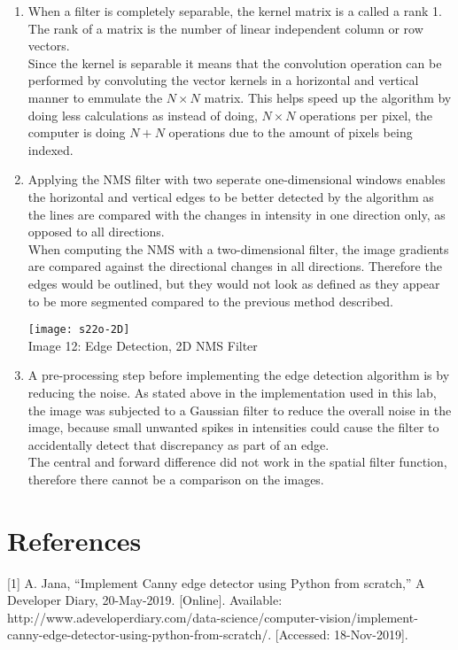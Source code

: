\documentclass{article}
\begin{document}
	\begin{enumerate}
		\item When a filter is completely separable, the kernel matrix is a called a rank 1. The rank of a matrix is the number of linear independent column or row vectors.\\ 
		
		Since the kernel is separable it means that the convolution operation can be performed by convoluting the vector kernels in a horizontal and vertical manner to emmulate the $N \times N$ matrix. This helps speed up the algorithm by doing less calculations as instead of doing, $N \times N$ operations per pixel, the computer is doing $N + N$ operations due to the amount of pixels being indexed.
		
		\item Applying the NMS filter with two seperate one-dimensional windows enables the horizontal and vertical edges to be better detected by the algorithm as the lines are compared with the changes in intensity in one direction only, as opposed to all directions.\\
		
		When computing the NMS with a two-dimensional filter, the image gradients are compared against the directional changes in all directions. Therefore the edges would be outlined, but they would not look as defined as they appear to be more segmented compared to the previous method described.\\
		
		\begin{center}
			\noindent \texttt{[image: s22o-2D]}\\
			Image 12: Edge Detection, 2D NMS Filter\\
		\end{center}
		
		\item A pre-processing step before implementing the edge detection algorithm is by reducing the noise. As stated above in the implementation used in this lab, the image was subjected to a Gaussian filter to reduce the overall noise in the image, because small unwanted spikes in intensities could cause the filter to accidentally detect that discrepancy as part of an edge.\\
		
		The central and forward difference did not work in the spatial filter function, therefore there cannot be a comparison on the images. 
		
	\end{enumerate}
	
	\clearpage
	
	\section{References}
	
	[1] A. Jana, “Implement Canny edge detector using Python from scratch,” A Developer Diary, 20-May-2019. [Online]. Available: http://www.adeveloperdiary.com/data-science/computer-vision/implement-canny-edge-detector-using-python-from-scratch/. [Accessed: 18-Nov-2019].
	
\end{document}
